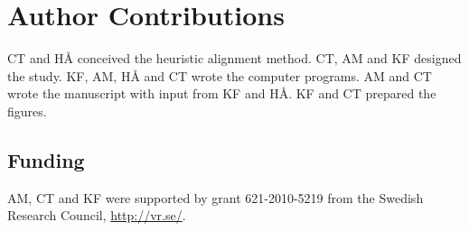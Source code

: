 \documentclass[10pt]{article}
\begin{document}

\section*{Author Contributions}
CT and HÅ conceived the heuristic alignment method.
CT, AM and KF designed the study.
KF, AM, HÅ and CT wrote the computer programs.
AM and CT wrote the manuscript with input from KF and HÅ.
KF and CT prepared the figures.

\subsection*{Funding}
AM, CT and KF were supported by grant 621-2010-5219 from the Swedish Research
Council, \url{http://vr.se/}.

%



%
%


\end{document}
